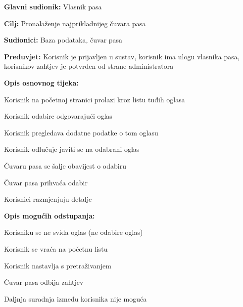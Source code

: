 					\noindent {}
					\begin{packed_item}
						
						\item \textbf{Glavni sudionik: } Vlasnik pasa
						\item  \textbf{Cilj:} Pronalaženje najprikladnijeg čuvara pasa
						\item  \textbf{Sudionici:} Baza podataka, čuvar pasa
						\item  \textbf{Preduvjet:} Korisnik je prijavljen u sustav, korisnik ima ulogu vlasnika pasa, korisnikov zahtjev je potvrđen od strane administratora
						\item  \textbf{Opis osnovnog tijeka:}
						
						\item[] \begin{packed_enum}
							
							\item Korisnik na početnoj stranici prolazi kroz listu tuđih oglasa   
							\item Korisnik odabire odgovarajući oglas
							\item Korisnik pregledava dodatne podatke o tom oglasu
							\item Korisnik odlučuje javiti se na odabrani oglas 
							\item Čuvaru pasa se šalje obavijest o odabiru
							\item Čuvar pasa prihvaća odabir
							\item Korisnici razmjenjuju detalje
							
						\end{packed_enum}
						
						\item  \textbf{Opis mogućih odstupanja:}
						
						\item[] \begin{packed_item}
							
							\item[4.a] Korisniku se ne sviđa oglas (ne odabire oglas)
							\item[] \begin{packed_enum}
								
								\item Korisnik se vraća na početnu listu
								\item Korisnik nastavlja s pretraživanjem
								
							\end{packed_enum}
							
							\item[6.a] Čuvar pasa odbija zahtjev 
							\item[] \begin{packed_enum}
								
								\item Daljnja suradnja između korisnika nije moguća
								
							\end{packed_enum}
						\end{packed_item}
					\end{packed_item}
					
